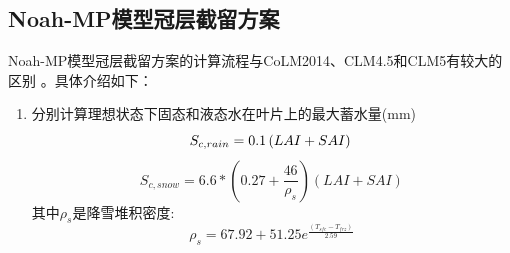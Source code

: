 \subsection{Noah-MP模型冠层截留方案}
Noah-MP模型冠层截留方案的计算流程与CoLM2014、CLM4.5和CLM5有较大的区别 \citet{niu2011community,he2023modernizing}。具体介绍如下：
\begin{enumerate}
\item 分别计算理想状态下固态和液态水在叶片上的最大蓄水量(mm)\\
\begin{equation}
S_{c,rain}=0.1\left(LAI+SAI\right)\\
\end{equation}
\begin{equation}
S_{c,snow}= 6.6*\left(0.27+{\frac{46}{\rho_{s}}}\right) \left(LAI+SAI\right)
\end{equation}
其中$\rho_{s}$是降雪堆积密度: 
\begin{equation}
\rho_{s}=67.92+51.25 e^{\frac{\left(T_{s f c}-T_{f r z}\right)}{2.59}}
\end{equation}


\end{enumerate}
